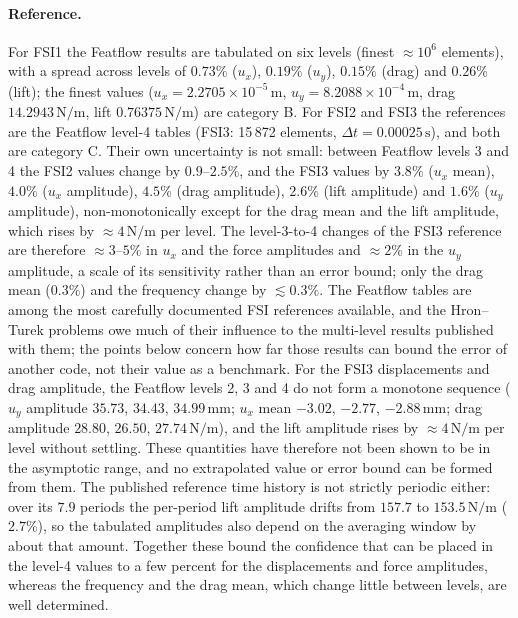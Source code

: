 \paragraph{Reference.}
For FSI1 the Featflow results are tabulated on six levels (finest $\approx10^6$ elements), with a spread across levels of $0.73\%$ ($u_x$), $0.19\%$ ($u_y$), $0.15\%$ (drag) and $0.26\%$ (lift); the finest values ($u_x = 2.2705\times10^{-5}\,\mathrm{m}$, $u_y = 8.2088\times10^{-4}\,\mathrm{m}$, drag $14.2943\,\mathrm{N/m}$, lift $0.76375\,\mathrm{N/m}$) are category B.
For FSI2 and FSI3 the references are the Featflow level-4 tables (FSI3: 15\,872 elements, $\Delta t = 0.00025\,\mathrm{s}$), and both are category C.
Their own uncertainty is not small: between Featflow levels 3 and 4 the FSI2 values change by $0.9$--$2.5\%$, and the FSI3 values by $3.8\%$ ($u_x$ mean), $4.0\%$ ($u_x$ amplitude), $4.5\%$ (drag amplitude), $2.6\%$ (lift amplitude) and $1.6\%$ ($u_y$ amplitude), non-monotonically except for the drag mean and the lift amplitude, which rises by $\approx4\,\mathrm{N/m}$ per level.
The level-3-to-4 changes of the FSI3 reference are therefore $\approx3$--$5\%$ in $u_x$ and the force amplitudes and $\approx2\%$ in the $u_y$ amplitude, a scale of its sensitivity rather than an error bound; only the drag mean ($0.3\%$) and the frequency change by $\lesssim0.3\%$.
The Featflow tables are among the most carefully documented FSI references available, and the Hron--Turek problems owe much of their influence to the multi-level results published with them; the points below concern how far those results can bound the error of another code, not their value as a benchmark.
For the FSI3 displacements and drag amplitude, the Featflow levels 2, 3 and 4 do not form a monotone sequence ($u_y$ amplitude $35.73$, $34.43$, $34.99\,\mathrm{mm}$; $u_x$ mean $-3.02$, $-2.77$, $-2.88\,\mathrm{mm}$; drag amplitude $28.80$, $26.50$, $27.74\,\mathrm{N/m}$), and the lift amplitude rises by $\approx4\,\mathrm{N/m}$ per level without settling. These quantities have therefore not been shown to be in the asymptotic range, and no extrapolated value or error bound can be formed from them.
The published reference time history is not strictly periodic either: over its $7.9$ periods the per-period lift amplitude drifts from $157.7$ to $153.5\,\mathrm{N/m}$ ($2.7\%$), so the tabulated amplitudes also depend on the averaging window by about that amount.
Together these bound the confidence that can be placed in the level-4 values to a few percent for the displacements and force amplitudes, whereas the frequency and the drag mean, which change little between levels, are well determined.
